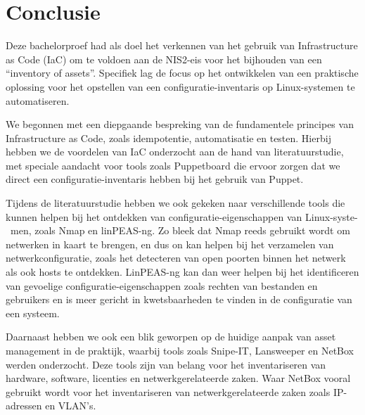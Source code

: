 
\chapter{Conclusie}%
\label{ch:conclusie}


Deze bachelorproef had als doel het verkennen van het gebruik van Infrastructure as Code (IaC) om te voldoen aan de NIS2-eis voor het bijhouden van een ``inventory of assets''.
Specifiek lag de focus op het ontwikkelen van een praktische oplossing voor het opstellen van een configuratie-inventaris op Linux-systemen te automatiseren.

We begonnen met een diepgaande bespreking van de fundamentele principes van Infrastructure as Code, zoals idempotentie, automatisatie en testen.
Hierbij hebben we de voordelen van IaC onderzocht aan de hand van literatuurstudie, met speciale aandacht voor tools zoals Puppetboard die ervoor zorgen dat we direct een configuratie-inventaris hebben bij het gebruik van Puppet.

Tijdens de literatuurstudie hebben we ook gekeken naar verschillende tools die kunnen helpen bij het ontdekken van configuratie-eigenschappen van Linux-syste-\ men, zoals Nmap en linPEAS-ng.
Zo bleek dat Nmap reeds gebruikt wordt om netwerken in kaart te brengen, en dus on kan helpen bij het verzamelen van netwerkconfiguratie, zoals het detecteren van open poorten binnen het netwerk als ook hosts te ontdekken.
LinPEAS-ng kan dan weer helpen bij het identificeren van gevoelige configuratie-eigenschappen zoals rechten van bestanden en gebruikers en is meer gericht in kwetsbaarheden te vinden in de configuratie van een systeem.

Daarnaast hebben we ook een blik geworpen op de huidige aanpak van asset management in de praktijk, waarbij tools zoals Snipe-IT, Lansweeper en NetBox werden onderzocht.
Deze tools zijn van belang voor het inventariseren van hardware, software, licenties en netwerkgerelateerde zaken.
Waar NetBox vooral gebruikt wordt voor het inventariseren van netwerkgerelateerde zaken zoals IP-adressen en VLAN's.

